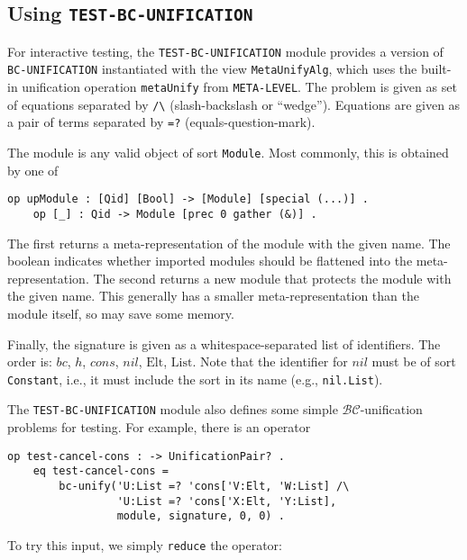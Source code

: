 \documentclass[11pt]{article}
\newcommand{\BC}{\mathcal{BC}}
\newcommand{\Elt}{\mathrm{Elt}}
\newcommand{\List}{\mathrm{List}}
\newcommand{\Bc}{\mathit{bc}}
\newcommand{\Hh}{\mathit{h}}
\newcommand{\Cons}{\mathit{cons}}
\newcommand{\Nil}{\mathit{nil}}
\begin{document}
\subsection{Using \lstinline|TEST-BC-UNIFICATION|}
\label{subappendix:using-bc-test-mod}

For interactive testing, the \lstinline|TEST-BC-UNIFICATION| module provides a
version of \lstinline|BC-UNIFICATION| instantiated with the view
\lstinline|MetaUnifyAlg|, which uses the built-in unification operation
\lstinline|metaUnify| from \lstinline|META-LEVEL|. The problem is given as
set of equations separated by \lstinline|/\| (slash-backslash or ``wedge'').
Equations are given as a pair of terms separated by \lstinline|=?|
(equals-question-mark).

The module is any valid object of sort \lstinline|Module|. Most commonly, this
is obtained by one of
\begin{lstlisting}[language=Maude, style=smalllisting]
    op upModule : [Qid] [Bool] -> [Module] [special (...)] .
    op [_] : Qid -> Module [prec 0 gather (&)] .
\end{lstlisting}
The first returns a meta-representation of the module with the given name. The
boolean indicates whether imported modules should be flattened into the
meta-representation. The second returns a new module that protects the module
with the given name. This generally has a smaller meta-representation than the
module itself, so may save some memory.

Finally, the signature is given as a whitespace-separated list of identifiers.
The order is: $\Bc$, $\Hh$, $\Cons$, $\Nil$, $\Elt$, $\List$. Note that the
identifier for $\Nil$ must be of sort \lstinline|Constant|, i.e., it must
include the sort in its name (e.g., \lstinline|nil.List|).
\vspace{1ex}



The \lstinline|TEST-BC-UNIFICATION| module also defines some simple
$\BC$-unification problems for testing. For example, there is an operator
\begin{lstlisting}[language=Maude, style=smalllisting]
    op test-cancel-cons : -> UnificationPair? .
    eq test-cancel-cons =
        bc-unify('U:List =? 'cons['V:Elt, 'W:List] /\
                 'U:List =? 'cons['X:Elt, 'Y:List],
                 module, signature, 0, 0) .
\end{lstlisting}
To try this input, we simply \lstinline|reduce| the operator:
\vspace{1ex}
\end{document}
